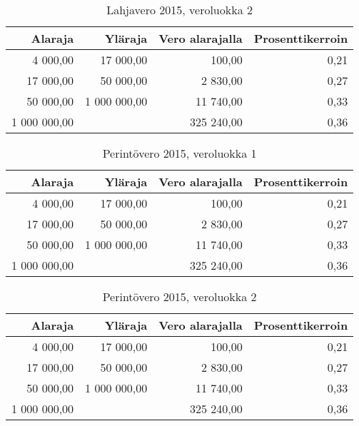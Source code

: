 \documentclass[a4paper,10pt]{article}\usepackage[]{graphicx}\usepackage[]{color}
\begin{document}
\begin{table}[ht]
\centering
\begin{tabular}{rrrr}
  \hline
Alaraja & Yläraja & Vero alarajalla & Prosenttikerroin \\ 
  \hline
4 000,00 & 17 000,00 & 100,00 & 0,21 \\ 
  17 000,00 & 50 000,00 & 2 830,00 & 0,27 \\ 
  50 000,00 & 1 000 000,00 & 11 740,00 & 0,33 \\ 
  1 000 000,00 &  & 325 240,00 & 0,36 \\ 
   \hline
\end{tabular}
\caption{Lahjavero 2015, veroluokka 2} 
\end{table}


\begin{table}[ht]
\centering
\begin{tabular}{rrrr}
  \hline
Alaraja & Yläraja & Vero alarajalla & Prosenttikerroin \\ 
  \hline
4 000,00 & 17 000,00 & 100,00 & 0,21 \\ 
  17 000,00 & 50 000,00 & 2 830,00 & 0,27 \\ 
  50 000,00 & 1 000 000,00 & 11 740,00 & 0,33 \\ 
  1 000 000,00 &  & 325 240,00 & 0,36 \\ 
   \hline
\end{tabular}
\caption{Perintövero 2015, veroluokka 1} 
\end{table}


\begin{table}[ht]
\centering
\begin{tabular}{rrrr}
  \hline
Alaraja & Yläraja & Vero alarajalla & Prosenttikerroin \\ 
  \hline
4 000,00 & 17 000,00 & 100,00 & 0,21 \\ 
  17 000,00 & 50 000,00 & 2 830,00 & 0,27 \\ 
  50 000,00 & 1 000 000,00 & 11 740,00 & 0,33 \\ 
  1 000 000,00 &  & 325 240,00 & 0,36 \\ 
   \hline
\end{tabular}
\caption{Perintövero 2015, veroluokka 2} 
\end{table}
\end{document}
